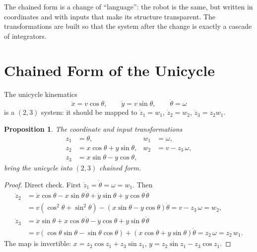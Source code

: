 \documentclass[11pt,a4paper]{article}
\theoremstyle{definition}
\theoremstyle{plain}
\newtheorem{proposition}[definition]{Proposition}
\theoremstyle{remark}
\begin{document}
\begin{intuition}
The chained form is a change of ``language'': the robot is the same, but written in coordinates and with inputs that make its structure transparent. The transformations are built so that the system after the change is exactly a cascade of integrators.
\end{intuition}

\section{Chained Form of the Unicycle}

The unicycle kinematics
\[
 \dot x=v\cos\theta,\qquad \dot y=v\sin\theta,\qquad\dot\theta=\omega
\]
is a $(2,3)$ system: it should be mapped to $\dot z_1=w_1$, $\dot z_2=w_2$, $\dot z_3=z_2w_1$.

\begin{proposition}\label{prop:unicycle}
The coordinate and input transformations
\begin{align*}
 z_1&=\theta, & w_1&=\omega,\\
 z_2&=x\cos\theta+y\sin\theta, & w_2&=v-z_3\,\omega,\\
 z_3&=x\sin\theta-y\cos\theta,
\end{align*}
bring the unicycle into $(2,3)$ chained form.
\end{proposition}
\begin{proof}
Direct check. First $\dot z_1=\dot\theta=\omega=w_1$. Then
\begin{align*}
 \dot z_2&=\dot x\cos\theta-x\sin\theta\,\dot\theta+\dot y\sin\theta+y\cos\theta\,\dot\theta\\
 &=v(\cos^2\theta+\sin^2\theta)-(x\sin\theta-y\cos\theta)\dot\theta=v-z_3\,\omega=w_2,\\
 \dot z_3&=\dot x\sin\theta+x\cos\theta\,\dot\theta-\dot y\cos\theta+y\sin\theta\,\dot\theta\\
 &=v(\cos\theta\sin\theta-\sin\theta\cos\theta)+(x\cos\theta+y\sin\theta)\dot\theta=z_2\,\omega=z_2\,w_1 .
\end{align*}
The map is invertible: $x=z_2\cos z_1+z_3\sin z_1$, $y=z_2\sin z_1-z_3\cos z_1$.
\end{proof}
\end{document}
